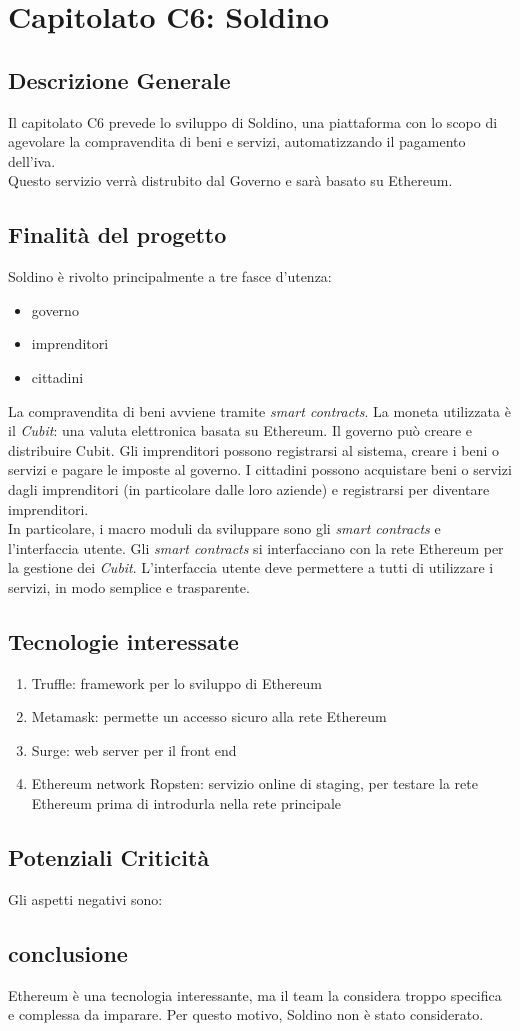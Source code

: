\chapter{Capitolato C6: Soldino}
\section{Descrizione Generale}

Il capitolato C6 prevede lo sviluppo di Soldino, una piattaforma con lo scopo di agevolare la compravendita di beni e servizi, automatizzando il pagamento dell'iva.\\
Questo servizio verrà distrubito dal Governo e sarà basato su Ethereum. 


\section{Finalit\`a del progetto}
Soldino è rivolto principalmente a tre fasce d'utenza:
\begin{itemize}
	\item governo
	\item imprenditori
	\item cittadini
\end{itemize}
La compravendita di beni avviene tramite \textit{smart contracts}. La moneta utilizzata è il \textit{Cubit}: una valuta elettronica basata su Ethereum.
Il governo può creare e distribuire Cubit. Gli imprenditori possono registrarsi al sistema, creare i beni o servizi e pagare le imposte al governo. I cittadini possono acquistare beni o servizi dagli imprenditori (in particolare dalle loro aziende) e registrarsi per diventare imprenditori.\\
In particolare, i macro moduli da sviluppare sono gli \textit{smart contracts} e l'interfaccia utente. Gli \textit{smart contracts} si interfacciano con la rete Ethereum per la gestione dei \textit{Cubit}. L'interfaccia utente deve permettere a tutti di utilizzare i servizi, in modo semplice e trasparente.


\section{Tecnologie interessate}
\begin{enumerate}
	\item Truffle: framework per lo sviluppo di Ethereum
	\item Metamask: permette un accesso sicuro alla rete Ethereum
	\item Surge: web server per il front end
	\item Ethereum network Ropsten: servizio online di staging, per testare la rete Ethereum prima di introdurla nella rete principale
	
\end{enumerate}
\section{Potenziali Criticità}
Gli aspetti negativi sono:
\section{conclusione}
Ethereum è una tecnologia interessante, ma il team la considera troppo specifica e complessa da imparare. Per questo motivo, Soldino non è stato considerato. 